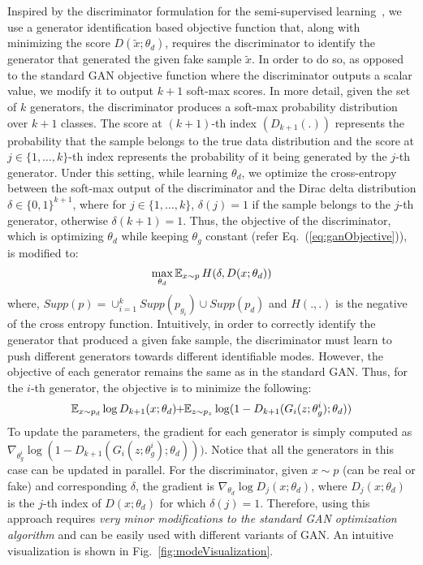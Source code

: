 Inspired by the discriminator formulation for the semi-supervised learning~\cite{salimans2016improved}, we use a generator identification based objective function that, along with minimizing the score $D(\tilde{x}; \theta_d)$, requires the discriminator to identify the generator that generated the given fake sample $\tilde{x}$. In order to do so, as opposed to the standard GAN objective function where the discriminator outputs a scalar value, we modify it to output $k+1$ soft-max scores. In more detail, given the set of $k$ generators, the discriminator produces a soft-max probability distribution over $k+1$ classes.  The score at $(k+1)$-th index $(D_{k+1}(.))$ represents the probability that the sample belongs to the true data distribution and the score at $j \in \{1, \dots, k\}$-th index represents the probability of it being generated by the $j$-th generator. Under this setting, while learning $\theta_d$, we optimize the cross-entropy between the soft-max output of the discriminator and the Dirac delta distribution $\delta \in \{0,1\}^{k+1}$, where for $j \in \{1, \dots, k\}$, $\delta(j) = 1$ if the sample belongs to the $j$-th generator, otherwise $\delta(k+1) = 1$. Thus, the objective of the discriminator, which is optimizing $\theta_d$ while keeping $\theta_g$ constant (refer Eq.~(\ref{eq:ganObjective})), is modified to:
\begin{align*}
	\max_{\theta_d} \operatorname{\mathbb{E}}_{x \sim p} H(\delta, D(x; \theta_d))
\end{align*}
where, $Supp(p) = \cup_{i=1}^k Supp(p_{g_i}) \cup Supp(p_d) $ and $H(.,.)$ is the negative of the cross entropy function. Intuitively, in order to correctly identify the generator that produced a given fake sample, the discriminator must learn to push different generators towards different identifiable modes. However, the objective of each generator remains the same as in the standard GAN. Thus, for the $i$-th generator, the objective is to minimize the following:
\begin{align}
	\mathbb{E}_{x\sim p_{d}}\log D_{k+1}(x; \theta_d) \hspace{-1mm}+ \hspace{-1mm}\mathbb{E}_{z \sim p_z}\log (1- D_{k+1}(G_i(z; \theta_g^i); \theta_d)) \nonumber
\end{align}
To update the parameters, the gradient for each generator is simply computed as $\nabla_{\theta_g^i} \log (1 - D_{k+1}(G_i(z; \theta_g^i); \theta_d)))$. Notice that all the generators in this case can be updated in parallel. For the discriminator, given $x \sim p$ (can be real or fake) and corresponding $\delta$, the gradient is $\nabla_{\theta_d}  \log D_j(x; \theta_d)$, where $D_j(x; \theta_d)$ is the $j$-th index of  $D(x; \theta_d)$ for which $\delta(j) = 1$. Therefore, using this approach requires {\em very minor modifications to the standard GAN optimization algorithm} and can be easily used with different variants of GAN. An intuitive visualization is shown in Fig.~\ref{fig:modeVisualization}.

